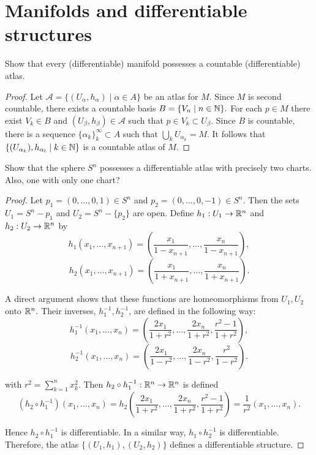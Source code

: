 \chapter{Manifolds and differentiable structures}

\begin{problem}{1}
Show that every (differentiable) manifold possesses a countable (differentiable) atlas.
\end{problem}
\begin{proof}
Let $\mathcal{A} = \{(U_\alpha, h_\alpha) \mid \alpha \in A \}$ be an atlas for $M.$ Since $M$ is second countable, there exists a countable basis $B = \{V_n \mid n \in \mathbb{N} \}.$ For each $p \in M$ there exist $V_k \in B$ and $(U_\beta, h_\beta) \in \mathcal A$ such that $p \in V_k \subset U_\beta.$ Since $B$ is countable, there is a sequence $\{\alpha_{k}\}_{k}^\infty \subset A$ such that $\bigcup_k U_{\alpha_k} = M$. It follows that $\{(U_{\alpha_k}), h_{\alpha_l} \mid k \in \mathbb{N} \}$ is a countable atlas of $M.$
\end{proof}

\begin{problem}{2}
Show that the sphere $S^n$ possesses a differentiable atlas with precisely two charts. Also, one with only one chart?
\end{problem}
\begin{proof}
Let $p_1 = (0, \ldots, 0, 1) \in S^n$ and $p_2 = (0,\ldots,0, -1) \in S^n$. Then the sets $U_ 1 = S^n - {p_1}$ and $U_2 = S^n - \{p_2\}$ are open. Define $h_1: U_1 \rightarrow \mathbb{R}^n$ and $h_2: U_2 \rightarrow \mathbb{R}^n$ by 
$$
h_1(x_1, \ldots, x_{n+1}) = \left(\frac{x_1}{1-x_{n+1}}, \ldots, \frac{x_n}{1-x_{n+1}}\right),
$$
$$
h_2(x_1, \ldots, x_{n+1}) = \left(\frac{x_1}{1+x_{n+1}}, \ldots, \frac{x_n}{1+x_{n+1}}\right).
$$

A direct argument shows that these functions are homeomorphisms from $U_1, U_2$ onto $\mathbb{R}^{n}.$ Their inverses, $h_1^{-1}, h_2^{-1}$, are defined in the following way:
$$
h_1^{-1}(x_1, \ldots, x_n) = \left( \frac{2x_1}{1 + r^2}, \ldots,  \frac{2 x_n}{1+r^2}, \frac{r^2-1}{1+r^2} \right),
$$
$$
h_2^{-1}(x_1, \ldots, x_n) = \left( \frac{2x_1}{1 - r^2}, \ldots,  \frac{2 x_n}{1-r^2}, \frac{r^2}{1-r^2} \right).
$$

with $r^2 = \sum_{k=1}^n x_k^2.$ Then $h_2 \circ h_1^{-1}: \mathbb{R}^n \rightarrow \mathbb{R}^n$ is defined 
$$ (h_2 \circ h_1^{-1}) (x_1, \ldots, x_n) = h_2 \left( \frac{2x_1}{1 + r^2}, \ldots,  \frac{2 x_n}{1+r^2}, \frac{r^2-1}{1+r^2} \right) = \frac{1}{r^2}(x_1, \ldots, x_n).$$

Hence $h_2 \circ h_1^{-1}$ is differentiable. In a similar way, $h_1 \circ h_2^{-1}$ is differentiable. Therefore, the atlas $\{(U_1, h_1), (U_2, h_2)\}$ defines a differentiable structure.

\end{proof}


